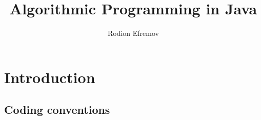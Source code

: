 \documentclass{book}
\title{Algorithmic Programming in Java}
\author{Rodion Efremov}
\begin{document}
\maketitle

\part{Introduction}

\chapter{Coding conventions}
\end{document}
